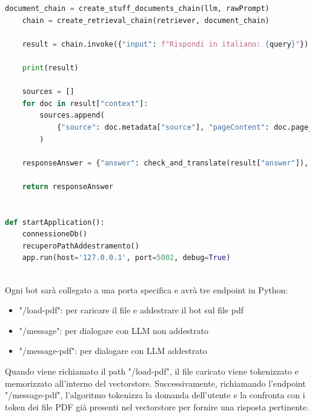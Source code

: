 \documentclass[a4paper,twoside,12pt]{toptesi}
\begin{document}
\begin{lstlisting}[language=Python, caption=Microservizi Python]
    document_chain = create_stuff_documents_chain(llm, rawPrompt)
    chain = create_retrieval_chain(retriever, document_chain)

    result = chain.invoke({"input": f"Rispondi in italiano: {query}"})

    print(result)

    sources = []
    for doc in result["context"]:
        sources.append(
            {"source": doc.metadata["source"], "pageContent": doc.page_content}
        )

    responseAnswer = {"answer": check_and_translate(result["answer"]), "sources": sources}

    return responseAnswer


def startApplication():
    connessioneDb()
    recuperoPathAddestramento()
    app.run(host='127.0.0.1', port=5002, debug=True)
        
\end{lstlisting}

Ogni bot sarà collegato a una porta specifica e avrà tre endpoint in Python:

\begin{itemize}
\item "/load-pdf": per caricare il file e addestrare il bot sul file pdf
\item "/message": per dialogare con LLM non addestrato
\item "/message-pdf": per dialogare con LLM addestrato
\end{itemize}

Quando viene richiamato il path "/load-pdf", il file caricato viene tokenizzato e memorizzato all'interno del vectorstore. Successivamente, richiamando l'endpoint "/message-pdf", l'algoritmo tokenizza la domanda dell'utente e la confronta con i token dei file PDF già presenti nel vectorstore per fornire una risposta pertinente.

\newpage
\end{document}
